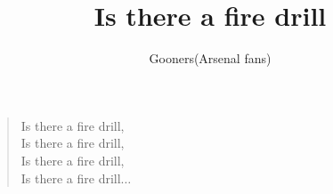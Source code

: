\documentclass[a4paper,12pt]{article}
\title{Is there a fire drill}
\author{Gooners(Arsenal fans)}
\date{}
\begin{document}
	
	\maketitle
	
	\begin{verse}
		
		Is there a fire drill, \\
		Is there a fire drill, \\
		Is there a fire drill, \\
		Is there a fire drill$\ldots$
		
	\end{verse}
	
\end{document}
